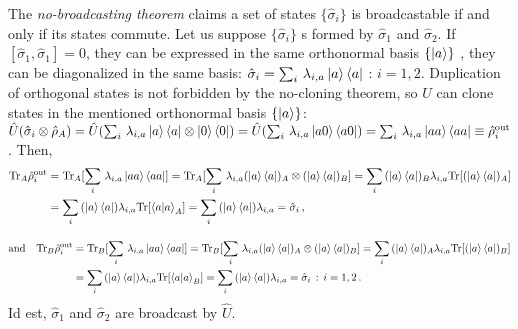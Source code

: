 \documentclass[11pt]{article}
\numberwithin{equation}{section} %
\numberwithin{figure}{section} %
\begin{document}
\begin{appendices}
The \emph{no-broadcasting theorem} claims a set of states $\{\hat{\sigma}_i\}$ is broadcastable if and only if its states commute. Let us suppose $\{\hat{\sigma}_i\}$ s formed by $\hat{\sigma}_1$ and $\hat{\sigma}_2$. If $[\hat{\sigma}_1,\hat{\sigma}_1]=0$, they can be expressed in the same orthonormal basis $\{\ket{a}\}$ \cite[p.~30, l.~5]{Sakurai}, they can be diagonalized in the same basis: $\hat{\sigma}_i=\sum_i\,\lambda_{i,a}\ket{a}\bra{a}$ : $i=1,2$. Duplication of orthogonal states is not forbidden by the no-cloning theorem, so $\hat{U}$ can clone states in the mentioned orthonormal basis $\{\ket{a}\}$: $\hat{U}(\hat{\sigma}_i\otimes\hat{\rho}_A)=\hat{U}(\sum_i\,\lambda_{i,a}\ket{a}\bra{a}\otimes\ket{0}\bra{0})=\hat{U}(\sum_i\,\lambda_{i,a}\ket{a0}\bra{a0})=\sum_i\,\lambda_{i,a}\ket{aa}\bra{aa}\equiv\hat{\rho}_i^{\textrm{out}}$. Then,
\begin{equation}
\begin{split}
\textrm{Tr}_{A}\hat{\rho}_i^{\textrm{out}}
&=\textrm{Tr}_{A}[\sum_i\,\lambda_{i,a}\ket{aa}\bra{aa}]=\textrm{Tr}_{A}[\sum_i\,\lambda_{i,a}(\ket{a}\bra{a})_A\otimes(\ket{a}\bra{a})_B]=\sum_i\,(\ket{a}\bra{a})_B\lambda_{i,a}\textrm{Tr}[(\ket{a}\bra{a})_A]\\
&=\sum_i\,(\ket{a}\bra{a})\lambda_{i,a}\textrm{Tr}[\braket{a|a}_A]=\sum_i\,(\ket{a}\bra{a})\lambda_{i,a}=\hat{\sigma}_i\,\textrm{,}
\end{split}
\end{equation}

\begin{equation}
\begin{split}
\textrm{and}\quad\textrm{Tr}_{B}\hat{\rho}_i^{\textrm{out}}
&=\textrm{Tr}_{B}[\sum_i\,\lambda_{i,a}\ket{aa}\bra{aa}]=\textrm{Tr}_{B}[\sum_i\,\lambda_{i,a}(\ket{a}\bra{a})_A\otimes(\ket{a}\bra{a})_B]=\sum_i\,(\ket{a}\bra{a})_A\lambda_{i,a}\textrm{Tr}[(\ket{a}\bra{a})_B]\\
&=\sum_i\,(\ket{a}\bra{a})\lambda_{i,a}\textrm{Tr}[\braket{a|a}_B]=\sum_i\,(\ket{a}\bra{a})\lambda_{i,a}=\hat{\sigma}_i\,:\,i=1,2\,\textrm{.}
\end{split}
\end{equation}
Id est, $\hat{\sigma}_1$ and $\hat{\sigma}_2$ are broadcast by $\hat{U}$.\\




\end{appendices}
\end{document}
